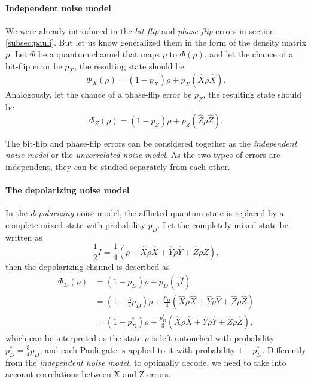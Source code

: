 \paragraph{Independent noise model}
We were already introduced in the \emph{bit-flip} and \emph{phase-flip} errors in section \ref{subsec:pauli}. But let us know generalized them in the form of the density matrix $\rho$. Let $\Phi$ be a quantum channel that maps $\rho$ to $\Phi(\rho)$, and let the chance of a bit-flip error be $p_X$, the resulting state should be
\begin{equation}\label{qec:eq:bitflip}
  \Phi_X(\rho) = (1-p_X)\rho + p_X(\hat{X}\rho \hat{X}).
\end{equation}
Analogously, let the chance of a phase-flip error be $p_Z$, the resulting state should be
\begin{equation}\label{qec:eq:phaseflip}
  \Phi_Z(\rho) = (1-p_Z)\rho + p_Z(\hat{Z}\rho \hat{Z}).
\end{equation}

The bit-flip and phase-flip errors can be considered together as the \emph{independent noise model} or the \emph{uncorrelated noise model}. As the two types of errors are independent, they can be studied separately from each other.

\paragraph{The depolarizing noise model}
In the \emph{depolarizing} noise model, the afflicted quantum state is replaced by a complete mixed state with probability $p_D$. Let the completely mixed state be written as
\begin{equation}\label{qec:eq:mixstate}
  \frac{1}{2}I = \frac{1}{4}(\rho + \hat{X}\rho \hat{X} + \hat{Y}\rho \hat{Y} + \hat{Z}\rho \hat{Z}),
\end{equation}
then the depolarizing channel is described as
\begin{align}\label{qec:eq:depolarizing}
  \nonumber \Phi_D(\rho) &= (1-p_D)\rho + p_D\left(\frac{1}{2}\hat{I}\right) \\
  \nonumber &= \left(1-\frac{3}{4}p_D\right)\rho + \frac{p_D}{4}(\hat{X}\rho \hat{X} + \hat{Y}\rho \hat{Y} + \hat{Z}\rho \hat{Z}) \\
  &= (1-p^*_D)\rho + \frac{p^*_D}{3}(\hat{X}\rho \hat{X} + \hat{Y}\rho \hat{Y} + \hat{Z}\rho \hat{Z}),
\end{align}
which can be interpreted as the state $\rho$ is left untouched with probability $p^*_D =\frac{3}{4}p_D$, and each Pauli gate is applied to it with probability $1-p^*_D$. Differently from the \emph{independent noise model}, to optimally decode, we need to take into account correlations between X and Z-errors.

